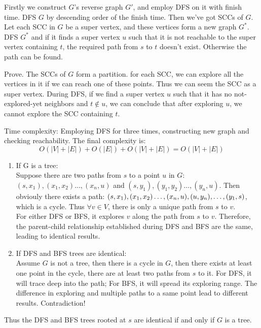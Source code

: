 \documentclass{oxmathproblems}
\begin{document}
\begin{questions}

\miquestion
Firstly we construct $G$'s reverse graph $G'$, and employ DFS on it with finish time.
DFS $G$ by descending order of the finish time. Then we've got SCCs of $G$.
Let each SCC in $G$ be a super vertex, and these vertices form a new graph $G^*$.
DFS $G^*$ and if it finds a super vertex $u$ such that it is not reachable to the super vertex containing $t$, 
the required path from $s$ to $t$ doesn't exist. Otherwise the path can be found.
\par
Prove. The SCCs of $G$ form a partition. for each SCC, we can explore all the vertices in it if we can reach one of these points. 
Thus we can seem the SCC as a super vertex. During DFS, if we find a super vertex $u$ such that it has no not-explored-yet neighbors and $t\notin u$, 
we can conclude that after exploring $u$, we cannot explore the SCC containing $t$.
\par
Time complexity: Employing DFS for three times, constructing new graph and checking reachability. The final complexity is:
$$O(|V|+|E|)+O(|E|)+O(|V|+|E|)=O(|V|+|E|)$$

\miquestion
\begin{enumerate}
    \item If G is a tree:\\
Suppose there are two paths from $s$ to a point $u$ in $G$: $(s,x_1),(x_1,x_2)\dots,(x_n,u)$ and $(s,y_1),(y_1,y_2)\dots,(y_n,u)$.
Then obviouly there exists a path: $(s,x_1),(x_1,x_2)\dots,\\
(x_n,u),(u,y_n),\dots,(y_1,s)$, which is a cycle. Thus $\forall v\in V$, there is only a unique path from $s$ to $v$.\\
For either DFS or BFS, it explores $v$ along the path from $s$ to $v$. Therefore, the parent-child relationship established during
DFS and BFS are the same, leading to identical results.
    \item If DFS and BFS trees are identical:\\
Assume $G$ is not a tree, then there is a cycle in $G$, then there exists at least one point in the cycle, there are at least two paths from $s$ to it.
For DFS, it will trace deep into the path; For BFS, it will spread its exploring range.
The difference in exploring and multiple paths to a same point lead to different results. Contradiction!
\end{enumerate}
Thus the DFS and BFS trees rooted at $s$ are identical if and only if $G$ is a tree.


\end{questions}
\end{document}
